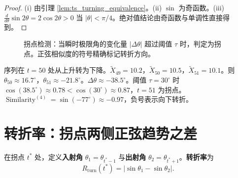 \begin{proof}
(i) 由引理 \ref{lem:ts_turning_equivalence}。(ii) $\sin$ 为奇函数。(iii) $\frac{d}{d\theta}\sin 2\theta = 2\cos 2\theta > 0$ 当 $|\theta| < \pi/4$。绝对值结论由奇函数与单调性直接得到。
\end{proof}

\begin{figure}[htbp]
\centering
{}
\caption{拐点检测：当瞬时极限角的变化量 $|\Delta\theta|$ 超过阈值 $\tau$ 时，判定为拐点。正弦相似度的符号精确标记转折方向。}
\label{fig:turning_point_detection}
\end{figure}

\begin{example}[拐点检测实例]\label{ex:ts_turning_example}
序列在 $t=50$ 处从上升转为下降。$\tilde{X}_{49} = 10.2$，$\tilde{X}_{50} = 10.5$，$\tilde{X}_{51} = 10.1$。则 $\theta_{50} \approx 16.7^\circ$，$\theta_{51} \approx -21.8^\circ$。$\Delta\theta \approx -38.5^\circ$。阈值 $\tau = 30^\circ$ 时 $\cos(38.5^\circ) \approx 0.78 < \cos(30^\circ) \approx 0.87$，$t=51$ 为拐点。$\operatorname{Similarity}^{(4)} = \sin(-77^\circ) \approx -0.97$，负号表示向下转折。
\end{example}

\section{转折率：拐点两侧正弦趋势之差}

\begin{definition}[转折率]\label{def:ts_refraction}
在拐点 $t^*$ 处，定义\textbf{入射角} $\theta_1 = \theta_{t^*-1}$ 与\textbf{出射角} $\theta_2 = \theta_{t^*+1}$。\textbf{转折率}为
\[
R_{\text{turn}}(t^*) = |\sin\theta_1 - \sin\theta_2|.
\]
\end{definition}

